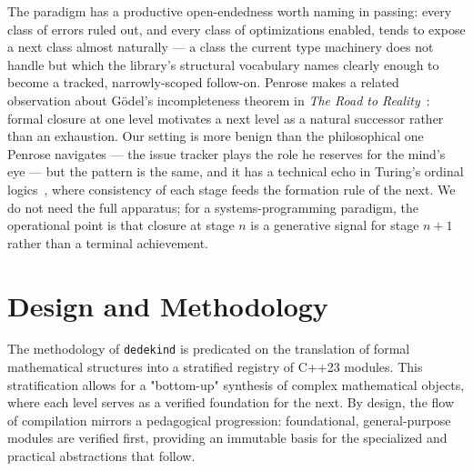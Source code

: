 \documentclass[11pt, a4paper]{report}
\begin{document}
The paradigm has a productive open-endedness worth naming in passing: every class of errors ruled out, and every class of optimizations enabled, tends to expose a next class almost naturally --- a class the current type machinery does not handle but which the library's structural vocabulary names clearly enough to become a tracked, narrowly-scoped follow-on. Penrose makes a related observation about G\"{o}del's incompleteness theorem in \emph{The Road to Reality}~\cite{penrose2004roadtoreality}: formal closure at one level motivates a next level as a natural successor rather than an exhaustion. Our setting is more benign than the philosophical one Penrose navigates --- the issue tracker plays the role he reserves for the mind's eye --- but the pattern is the same, and it has a technical echo in Turing's ordinal logics~\cite{turing1939ordinals}, where consistency of each stage feeds the formation rule of the next. We do not need the full apparatus; for a systems-programming paradigm, the operational point is that closure at stage $n$ is a generative signal for stage $n{+}1$ rather than a terminal achievement.


\chapter{Design and Methodology}
\label{chap:methodology}

The methodology of \texttt{dedekind} is predicated on the translation of formal mathematical structures into a stratified registry of C++23 modules. This stratification allows for a "bottom-up" synthesis of complex mathematical objects, where each level serves as a verified foundation for the next.
By design, the flow of compilation mirrors a pedagogical progression: foundational, general-purpose modules are verified first, providing an immutable basis for the specialized and practical abstractions that follow.
\end{document}
